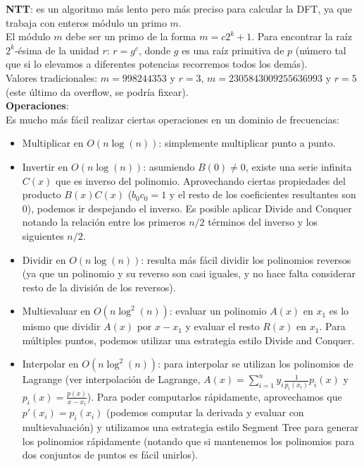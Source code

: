 {%
\textbf{NTT}: es un algoritmo más lento pero más preciso para calcular la DFT,
ya que trabaja con enteros módulo un primo $m$. \\
El módulo $m$ debe ser un primo de la forma $m = c2^k + 1$.
Para encontrar la raíz $2^k$-ésima de la unidad $r$: $r = g ^ c$, donde $g$ es una raíz primitiva de $p$ (número tal que si lo elevamos a diferentes potencias recorremos todos los demás). \\
Valores tradicionales: $m = 998244353$ y $r = 3$, $m = 2305843009255636993$ y $r = 5$ (este último da overflow, se podría fixear). \\

\textbf{Operaciones}: \\
Es mucho más fácil realizar ciertas operaciones en un dominio de frecuencias:
\begin{itemize}
	\item Multiplicar en $O(n\log(n))$: simplemente multiplicar punto a punto.

    \item Invertir en $O(n\log(n))$: asumiendo $B(0) \neq 0$, existe una serie infinita $C(x)$ que es inverso del polinomio.
    Aprovechando ciertas propiedades del producto $B(x)C(x)$ ($b_0c_0 = 1$ y el resto de los coeficientes resultantes son $0$),
    podemos ir despejando el inverso. Es posible aplicar Divide and Conquer notando la relación entre los primeros $n/2$ términos
    del inverso y los siguientes $n/2$.

	\item Dividir en $O(n\log(n))$: resulta más fácil dividir los polinomios reversos (ya que un polinomio y su reverso son casi iguales,
	y no hace falta considerar resto de la división de los reversos).
	
    \item Multievaluar en $O(n\log^2(n))$: evaluar un polinomio $A(x)$ en $x_1$ es lo mismo que dividir $A(x)$ por $x - x_1$ y evaluar el resto
    $R(x)$ en $x_1$. Para múltiples puntos, podemos utilizar una estrategia estilo Divide and Conquer.

    \item Interpolar en $O(n\log^2(n))$: para interpolar se utilizan los polinomios de Lagrange (ver interpolación de Lagrange, 
    $A(x)=\sum_{i=1}^{n} y_i\frac{1}{p_i(x_i)}p_i(x)$ y $p_i(x) = \frac{p(x)}{x-x_i}$). Para poder computarlos rápidamente, aprovechamos que
    $p'(x_i)=p_i(x_i)$ (podemos computar la derivada y evaluar con multievaluación) y utilizamos una estrategia estilo Segment Tree para
    generar los polinomios rápidamente (notando que si mantenemos los polinomios para dos conjuntos de puntos es fácil unirlos).


\end{itemize}}
